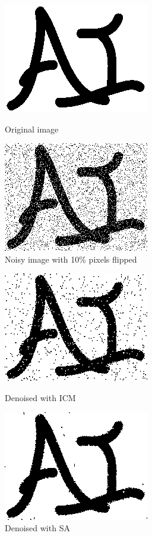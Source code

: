 \documentclass{article}
\begin{document}
\begin{figure}[H]
	\begin{minipage}[b]{0.48\linewidth}
		\centering
		\includegraphics[width=180pt]{../img/in.png}
		\caption{Original image}
		\label{fig:original}
	\end{minipage}
	\begin{minipage}[b]{0.48\linewidth}
		\centering
		\includegraphics[width=180pt]{../img/flipped.png}
		\caption{Noisy image with 10\% pixels flipped}
		\label{fig:noisy}
	\end{minipage}
\end{figure}
\begin{figure}[H]
	\centering
	\begin{minipage}[b]{0.45\linewidth}
		\centering
		\includegraphics[width=180pt]{../img/icm.png}
		\caption{Denoised with ICM}
		\label{fig:icm}
	\end{minipage}
	\begin{minipage}[b]{0.45\linewidth}
		\centering
		\includegraphics[width=180pt]{../img/best.png}
		\caption{Denoised with SA}
		\label{fig:sa}
	\end{minipage}
\end{figure}
\end{document}
